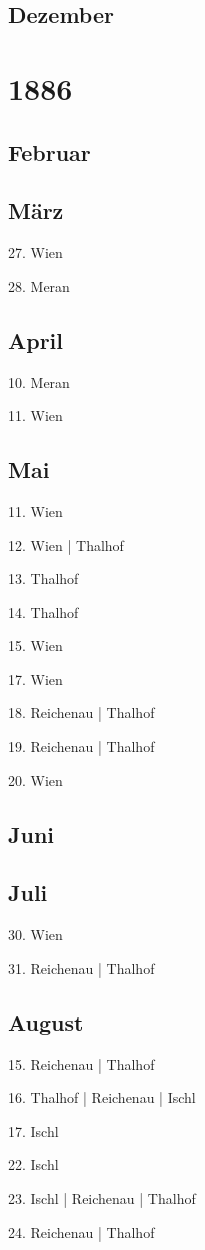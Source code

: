\documentclass[twoside=false,titlepage=false,open=any, parskip=never, fontsize=10pt, headings=small, chapterprefix=false, appendixprefix=false, DIV=15]{scrbook}
\begin{document}
\begin{multicols}{3}
            \section*{Dezember}
            \chapter*{1886}
            \section*{Februar}
            \section*{März}
            27. Wien\par
            28. Meran\par
            \section*{April}
            10. Meran\par
            11. Wien\par
            \section*{Mai}
            11. Wien\par
            12. Wien | Thalhof\par
            13. Thalhof\par
            14. Thalhof\par
            15. Wien\par
            17. Wien\par
            18. Reichenau | Thalhof\par
            19. Reichenau | Thalhof\par
            20. Wien\par
            \section*{Juni}
            \section*{Juli}
            30. Wien\par
            31. Reichenau | Thalhof\par
            \section*{August}
            15. Reichenau | Thalhof\par
            16. Thalhof | Reichenau | Ischl\par
            17. Ischl\par
            22. Ischl\par
            23. Ischl | Reichenau | Thalhof\par
            24. Reichenau | Thalhof\par

\end{multicols}
\end{document}
